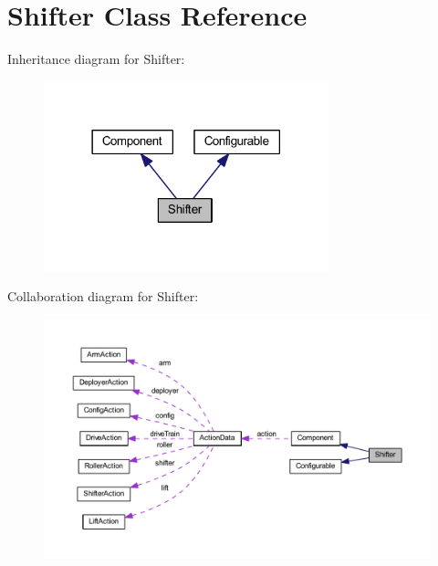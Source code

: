 \hypertarget{class_shifter}{
\section{\-Shifter \-Class \-Reference}
\label{class_shifter}
}


\-Inheritance diagram for \-Shifter\-:\nopagebreak
\begin{figure}[H]
\begin{center}
\leavevmode
\includegraphics[width=234pt]{class_shifter__inherit__graph}
\end{center}
\end{figure}


\-Collaboration diagram for \-Shifter\-:\nopagebreak
\begin{figure}[H]
\begin{center}
\leavevmode
\includegraphics[width=350pt]{class_shifter__coll__graph}
\end{center}
\end{figure}
